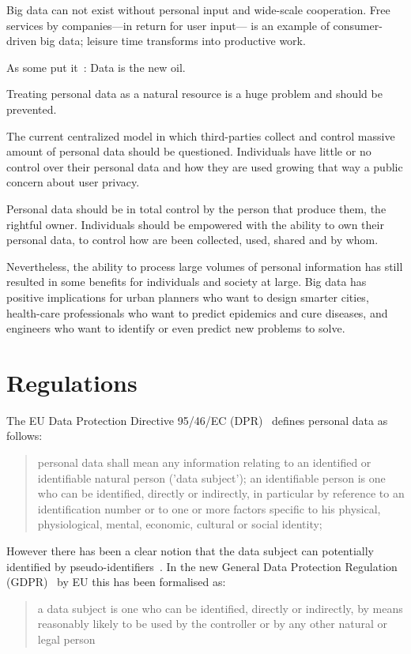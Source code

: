 Big data can not exist without personal input and wide-scale cooperation. Free services by companies---in return for user input--- is an example of consumer-driven big data; leisure time transforms into productive work.

As some put it~\cite{data_new_oil_01,data_new_oil_02,data_new_oil_03,data_new_oil_04,data_new_oil_05,data_new_oil_05,data_new_oil_06,data_new_oil_07,data_new_oil_08,data_new_oil_09}: Data is the new oil.

Treating personal data as a natural resource is a huge problem and should be prevented.

The current centralized model in which third-parties collect and control massive amount of personal data should be questioned.
Individuals have little or no control over their personal data and how they are used growing that way a public concern about
user privacy.

Personal data should be in total control by the person that produce them, the rightful owner. Individuals should be empowered
with the ability to own their personal data, to control how are been collected, used, shared and by whom.

Nevertheless, the ability to process large volumes of personal information has still resulted in some benefits for individuals and society at large. Big data has positive implications for urban planners who want to design smarter cities, health-care professionals who want to predict epidemics and cure diseases, and engineers who want to identify or even predict new problems to solve.

\section{Regulations}\label{problem:regulations}

The EU Data Protection Directive 95/46/EC (DPR)~\cite{eu-46ec-1995} defines personal data as follows:
\blockquote{
personal data shall mean any information relating to an identified or identifiable natural person ('data subject'); an identifiable person is one who can be identified, directly or indirectly, in particular by reference to an identification number or to one or more factors specific to his physical, physiological, mental, economic, cultural or social identity;
}
However there has been a clear notion that the data subject can potentially identified by pseudo-identifiers~\cite{wiki:pii}.
In the new General Data Protection Regulation (GDPR)~\cite{gdpr} by EU this has been formalised as:
\blockquote{
a data subject is one who can be identified, directly or indirectly, by means reasonably likely to be used by the controller or by any other natural or legal person
}

